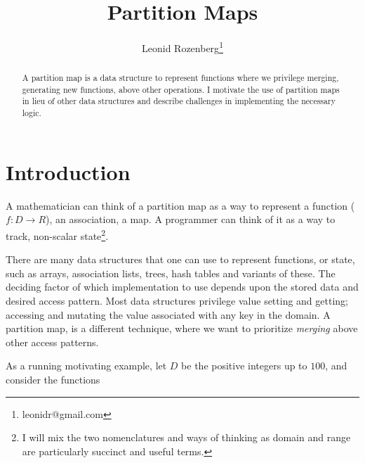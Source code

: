 \documentclass{article}
\begin{document}
\title{Partition Maps}
\author{Leonid Rozenberg\thanks{leonidr@gmail.com}}
\date{}                             %
\maketitle

\begin{abstract}
  A partition map is a data structure to represent functions where we
  privilege merging,
  generating new functions,
  above other operations.
  I motivate the use of partition maps in lieu of other data structures
  and describe challenges in implementing the necessary logic.
\end{abstract}

\section{Introduction}

A mathematician can think of a partition map as a way to represent a function
($f : D \rightarrow R$), an association, a map.
A programmer can think of it as a way to track, non-scalar
state\footnote{I will mix the two nomenclatures and ways of thinking
as domain and range are particularly succinct and useful terms.}.

There are many data structures that one can use to represent functions,
or state,
such as arrays, association lists, trees, hash tables and variants of these.
The deciding factor of which implementation to use depends upon the stored
data and desired access pattern.
Most data structures privilege value setting and getting;
accessing and mutating the value associated with any key in the domain.
A partition map, is a different technique, where we want to prioritize
\emph{merging} above other access patterns.

As a running motivating example,
let $D$ be the positive integers up to $100$,
and consider the functions
\end{document}
